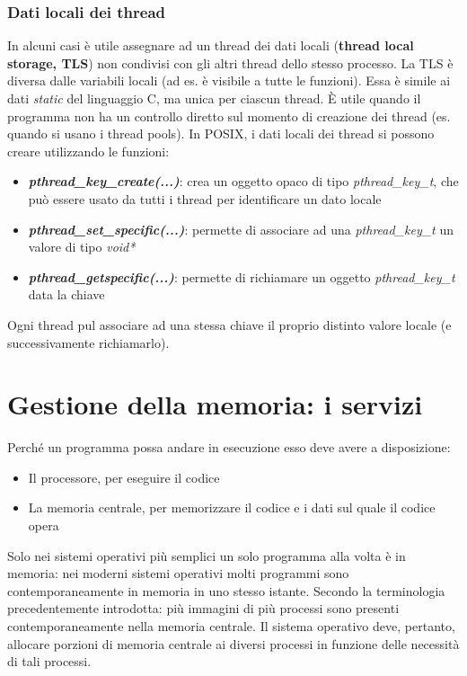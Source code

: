 \documentclass[12pt]{article}
\begin{document}
\subsubsection{Dati locali dei thread}
In alcuni casi è utile assegnare ad un thread dei dati locali (\textbf{thread local storage, TLS}) non condivisi con gli altri thread dello stesso processo.
La TLS è diversa dalle variabili locali (ad es. è visibile a tutte le funzioni). Essa è simile ai dati \textit{static} del linguaggio C, ma unica per ciascun thread. È utile quando il programma non ha un controllo
diretto sul momento di creazione dei thread (es. quando si usano i thread pools). In POSIX, i dati locali dei thread si possono creare utilizzando le funzioni:
\begin{itemize}
    \item \textbf{\textit{pthread\_key\_create(...)}}: crea un oggetto opaco di tipo \textit{pthread\_key\_t}, che può essere usato da tutti i thread per identificare un dato locale
    \item \textbf{\textit{pthread\_set\_specific(...)}}: permette di associare ad una \textit{pthread\_key\_t} un valore di tipo \textit{void*}
    \item \textbf{\textit{pthread\_getspecific(...)}}: permette di richiamare un oggetto \textit{pthread\_key\_t} data la chiave
\end{itemize} 
Ogni thread pul associare ad una stessa chiave il proprio distinto valore locale (e successivamente richiamarlo).

\section{Gestione della memoria: i servizi}
Perché un programma possa andare in esecuzione esso deve avere a disposizione:
\begin{itemize}
    \item Il processore, per eseguire il codice
    \item La memoria centrale, per memorizzare il codice e i dati sul quale il codice opera
\end{itemize}
Solo nei sistemi operativi più semplici un solo programma alla volta è in memoria: nei moderni sistemi operativi molti programmi sono contemporaneamente in memoria in uno stesso istante.
Secondo la terminologia precedentemente introdotta: più immagini di più processi sono presenti contemporaneamente nella memoria centrale.
Il sistema operativo deve, pertanto, allocare porzioni di memoria centrale ai diversi processi in funzione delle necessità di tali processi.
\end{document}
